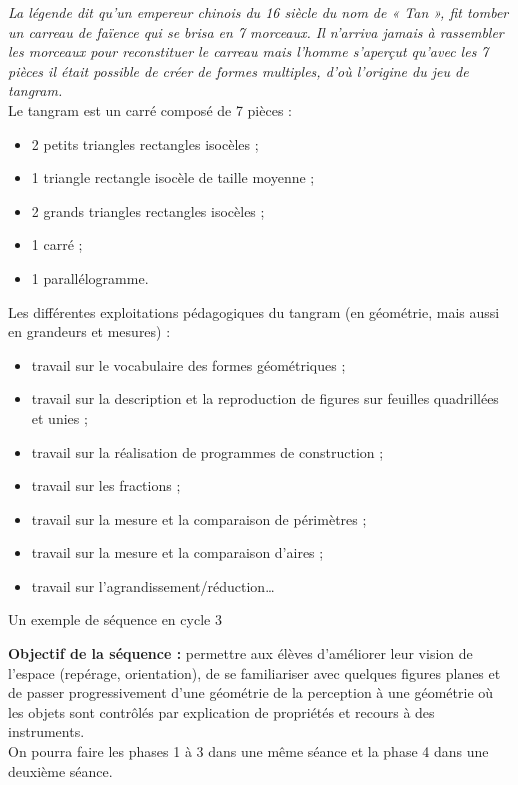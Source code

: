 \begin{exercice*}
{\it La légende dit qu'un empereur chinois du 16 siècle du nom de « Tan », fit tomber un carreau de faïence qui se brisa en 7 morceaux. Il n'arriva jamais à rassembler les morceaux pour reconstituer le carreau mais l'homme s'aperçut qu'avec les 7 pièces il était possible de créer de formes multiples, d'où l'origine du jeu de tangram.} \\

Le tangram est un carré composé de 7 pièces :
\begin{itemize}
   \item 2 petits triangles rectangles isocèles ;
   \item 1 triangle rectangle isocèle de taille moyenne ;
   \item 2 grands triangles rectangles isocèles ;
   \item 1 carré ;
   \item 1 parallélogramme. \\
\end{itemize}

Les différentes exploitations pédagogiques du tangram (en géométrie, mais aussi en grandeurs et mesures) :
\begin{itemize}
   \item travail sur le vocabulaire des formes géométriques ;
   \item travail sur la description et la reproduction de figures sur feuilles quadrillées et unies ;
   \item travail sur la réalisation de programmes de construction ;
   \item travail sur les fractions ;
   \item travail sur la mesure et la comparaison de périmètres ;
   \item travail sur la mesure et la comparaison d’aires ;
   \item travail sur l’agrandissement/réduction\dots \\
\end{itemize}

\begin{center}
   {\textcolor{B1}{{\Large Un exemple de séquence en cycle 3}}}
\end{center}

{\bf Objectif de la séquence :} permettre aux élèves d’améliorer leur vision de l’espace (repérage, orientation), de se familiariser avec quelques figures planes et de passer progressivement d’une géométrie de la perception à une géométrie où les objets sont contrôlés par explication de propriétés et recours à des instruments. \\
On pourra faire les phases 1 à 3 dans une même séance et la phase 4 dans une deuxième séance. \\


\end{exercice*}
